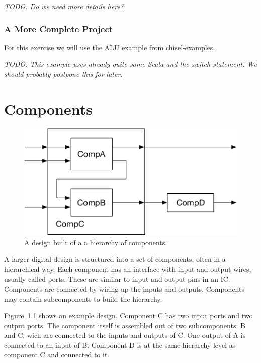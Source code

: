 \documentclass[%
    10pt, %
    headinclude, footexclude,
    openright, %
    notitlepage,
    cleardoubleempty,
    headsepline,
    pointlessnumbers,
    bibtotoc, idxtotoc,
    ]{scrbook}
\newcommand{\scale}{0.7}
\newcommand{\todo}[1]{{\emph{TODO: #1}}}
\newcommand{\myref}[2]{\href{#1}{#2}}
\begin{document}
\todo{Do we need more details here?}

\subsection{A More Complete Project}


For this exercise we will use the ALU example from \myref{https://github.com/schoeberl/chisel-examples}{chisel-examples}.

\todo{This example uses already quite some Scala and the switch statement.
We should probably postpone this for later.}


\chapter{Components}

\begin{figure}
  \centering
  \includegraphics[scale=\scale]{figures/components}
  \caption{A design built of a a hierarchy of components.}
  \label{fig:components}
\end{figure}


A larger digital design is structured into a set of components, often in
a hierarchical way. Each component has an interface with input and output
wires, usually called ports. These are similar to input and output pins in an IC.
Components are connected by wiring up the inputs and outputs.
Components may contain subcomponents to build the hierarchy.

Figure~\ref{fig:components} shows an example design. Component C has
two input ports and two output ports. The component itself is assembled out
of two subcomponents: B and C, wich are connected to the inputs and
outputs of C. One output of A is connected to an input of B.
Component D is at the same hierarchy level as component C and connected
to it.
\end{document}
